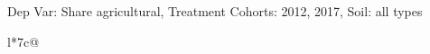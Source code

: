 \begin{table}[H]
\captionlistentry[table]{}
\label{table:beaver_land_class_DVis_land_class_1_SCg12_SSall_soil}
\scriptsize %
Dep Var: Share agricultural, Treatment Cohorts: 2012, 2017, Soil: all types \\
\begin{threeparttable}
\begin{tabulary}{\textwidth}{l*{7}{c}@{}}
\toprule \toprule
\noalign{\smallskip}
\noalign{\smallskip}
\midrule \bottomrule
\end{tabulary}
\medskip
\end{threeparttable}
\end{table}
